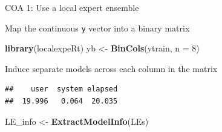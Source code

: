 \documentclass[ignorenonframetext,]{beamer}
\newenvironment{Shaded}{\begin{snugshade}}{\end{snugshade}}
\newcommand{\KeywordTok}[1]{\textcolor[rgb]{0.13,0.29,0.53}{\textbf{{#1}}}}
\newcommand{\DataTypeTok}[1]{\textcolor[rgb]{0.13,0.29,0.53}{{#1}}}
\newcommand{\DecValTok}[1]{\textcolor[rgb]{0.00,0.00,0.81}{{#1}}}
\newcommand{\StringTok}[1]{\textcolor[rgb]{0.31,0.60,0.02}{{#1}}}
\newcommand{\OtherTok}[1]{\textcolor[rgb]{0.56,0.35,0.01}{{#1}}}
\newcommand{\NormalTok}[1]{{#1}}
\begin{document}
\begin{frame}[fragile]{COA 1: Use a local expert ensemble}

Map the continuous \texttt{y} vector into a binary matrix

\footnotesize

\begin{Shaded}
\begin{Highlighting}[]
\KeywordTok{library}\NormalTok{(localexpeRt)}
\NormalTok{yb <-}\StringTok{ }\KeywordTok{BinCols}\NormalTok{(ytrain, }\DataTypeTok{n =} \DecValTok{8}\NormalTok{)}
\end{Highlighting}
\end{Shaded}

\normalsize
Induce separate models across each column in the matrix

\footnotesize

\begin{Shaded}
\end{Shaded}

\begin{verbatim}
##    user  system elapsed 
##  19.996   0.064  20.035
\end{verbatim}

\begin{Shaded}
\begin{Highlighting}[]
\NormalTok{LE_info <-}\StringTok{ }\KeywordTok{ExtractModelInfo}\NormalTok{(LEs)}
\end{Highlighting}
\end{Shaded}

\end{frame}
\end{document}
